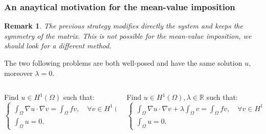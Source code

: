 \documentclass[9pt]{beamer}
\newtheorem*{remark}{Remark}
\begin{document}
\begin{frame}
\frametitle{An anaytical motivation for the mean-value imposition}
\begin{remark}
The previous strategy modifies directly the system and keeps the symmetry of the matrix. This is not possible for the mean-value imposition, we should look for a different method.
\end{remark}
\vspace{2mm}
\begin{lemma}
	The two following problems are both well-posed and have the same solution $u$, moreover $\lambda=0$.
\end{lemma}
\vspace{2mm}

\begin{columns}
	\begin{column}{0.45\textwidth}
		Find $u\in H^1(\Omega)$ such that:
		\begin{equation*}
		\begin{cases}
		\int_{\Omega}\nabla u \cdot \nabla v = \int_{\Omega} fv, \quad \forall v \in H^1(\Omega),\\[2ex]
		\int_{\Omega}u = 0.
		\end{cases}
		\end{equation*}
	\end{column}
	\begin{column}{0.55\textwidth}  
		Find $ u \in H^1(\Omega), \lambda \in \mathbb{R}$ such that:
		\begin{equation*}
		\begin{cases}
	     \int_{\Omega}\nabla u \cdot \nabla v + \lambda \int_\Omega v = \int_{\Omega} fv, \quad \forall v \in H^1(\Omega), \\[2ex]
		\int_{\Omega}u= 0.
		\end{cases}
		\end{equation*}
	\end{column}
\end{columns}
\end{frame}
\end{document}

